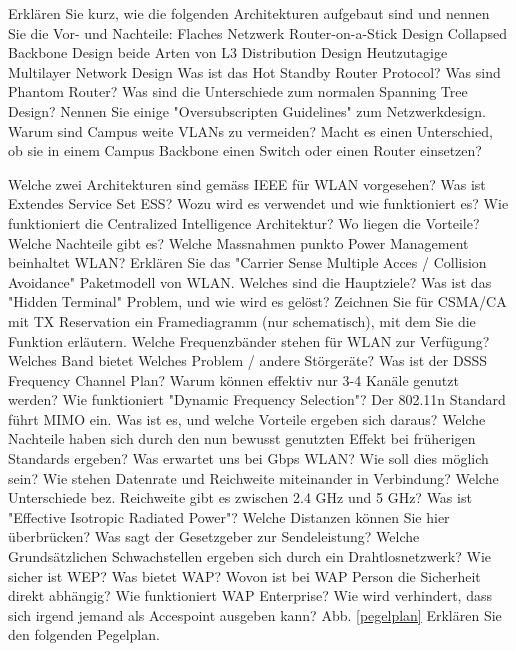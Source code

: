 \documentclass[ngerman,a4paper,12pt]{scrreprt}
\begin{document}
\olR
	\li Erklären Sie kurz, wie die folgenden Architekturen aufgebaut sind und nennen Sie die Vor- und Nachteile:
		\ol 
			\li Flaches Netzwerk
			\li Router-on-a-Stick Design
			\li Collapsed Backbone Design
			\li beide Arten von L3 Distribution Design
			\li Heutzutagige Multilayer Network Design
		\olE
	\li Was ist das Hot Standby Router Protocol?
	\li Was sind Phantom Router?
	\li Was sind die Unterschiede zum normalen Spanning Tree Design?
	\li Nennen Sie einige "Oversubscripten Guidelines" zum Netzwerkdesign.
	\li Warum sind Campus weite VLANs zu vermeiden?
	\li Macht es einen Unterschied, ob sie in einem Campus Backbone einen Switch oder einen Router einsetzen?
\olS


\olR
	\li Welche zwei Architekturen sind gemäss IEEE für WLAN vorgesehen?
	\li Was ist Extendes Service Set ESS? Wozu wird es verwendet und wie funktioniert es?
	\li Wie funktioniert die Centralized Intelligence Architektur? Wo liegen die Vorteile? Welche Nachteile gibt es?
	\li Welche Massnahmen punkto Power Management beinhaltet WLAN?
	\li Erklären Sie das "Carrier Sense Multiple Acces / Collision Avoidance" Paketmodell von WLAN. Welches sind die Hauptziele?
	\li Was ist das "Hidden Terminal" Problem, und wie wird es gelöst?
	\li Zeichnen Sie für CSMA/CA mit TX Reservation ein Framediagramm (nur schematisch), mit dem Sie die Funktion erläutern.
	\li Welche Frequenzbänder stehen für WLAN zur Verfügung? Welches Band bietet Welches Problem / andere Störgeräte?
	\li Was ist der DSSS Frequency Channel Plan? Warum können effektiv nur 3-4 Kanäle genutzt werden?
	\li Wie funktioniert "Dynamic Frequency Selection"?
	\li Der 802.11n Standard führt MIMO ein. Was ist es, und welche Vorteile ergeben sich daraus? Welche Nachteile haben sich durch den nun bewusst genutzten Effekt bei früherigen Standards ergeben?
	\li Was erwartet uns bei Gbps WLAN? Wie soll dies möglich sein?
	\li Wie stehen Datenrate und Reichweite miteinander in Verbindung? Welche Unterschiede bez. Reichweite gibt es zwischen 2.4 GHz und 5 GHz?
	\li Was ist "Effective Isotropic Radiated Power"? Welche Distanzen können Sie hier überbrücken? Was sagt der Gesetzgeber zur Sendeleistung?
	\li Welche Grundsätzlichen Schwachstellen ergeben sich durch ein Drahtlosnetzwerk?
	\li Wie sicher ist WEP? Was bietet WAP? Wovon ist bei WAP Person die Sicherheit direkt abhängig? Wie funktioniert WAP Enterprise? Wie wird verhindert, dass sich irgend jemand als Accespoint ausgeben kann?
	\li Abb. \ref{pegelplan} Erklären Sie den folgenden Pegelplan.
\end{document}
